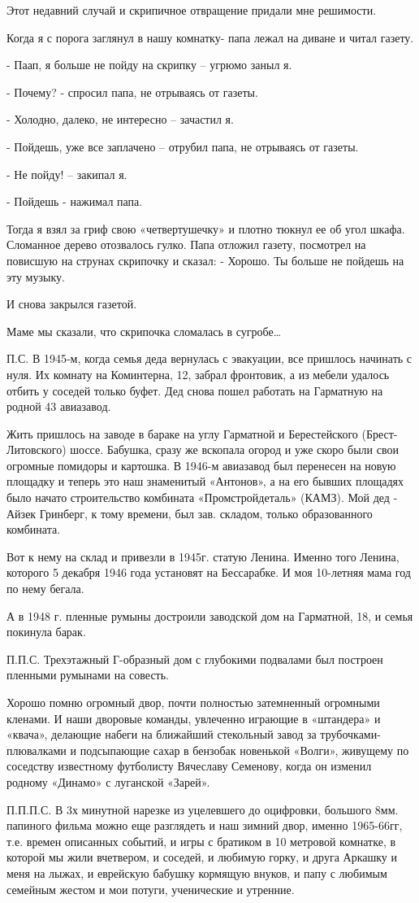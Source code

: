 Этот недавний случай и скрипичное отвращение придали мне решимости.

Когда я с порога заглянул в нашу комнатку- папа лежал на диване и читал газету.

- Паап, я больше не пойду на скрипку – угрюмо заныл я.

- Почему? - спросил папа, не отрываясь от газеты.

- Холодно, далеко, не интересно – зачастил я.

- Пойдешь, уже все заплачено – отрубил папа, не отрываясь от газеты.

- Не пойду! – закипал я.

- Пойдешь - нажимал папа.

Тогда я взял за гриф свою «четвертушечку» и плотно тюкнул ее об угол шкафа.
Сломанное дерево отозвалось гулко. Папа отложил газету, посмотрел на повисшую
на струнах скрипочку и сказал: - Хорошо. Ты больше не пойдешь на эту музыку. 

И снова закрылся газетой. 

Маме мы сказали, что скрипочка сломалась в сугробе…

П.С.  В 1945-м, когда семья деда вернулась с эвакуации, все пришлось начинать с
нуля. Их комнату на Коминтерна, 12, забрал фронтовик, а из мебели удалось
отбить у соседей только буфет. Дед снова пошел работать на Гарматную на родной
43 авиазавод.  

Жить пришлось на заводе в бараке на углу Гарматной и Берестейского
(Брест-Литовского) шоссе. Бабушка, сразу же вскопала огород и уже скоро были
свои огромные помидоры и картошка. В 1946-м авиазавод был перенесен на новую
площадку и теперь это наш знаменитый «Антонов», а на его бывших площадях было
начато строительство комбината «Промстройдеталь» (КАМЗ). Мой дед - Айзек
Гринберг, к тому времени, был зав. складом, только образованного комбината.

Вот к нему на склад и привезли в 1945г. статую Ленина. Именно того Ленина,
которого 5 декабря 1946 года   установят на Бессарабке. И моя 10-летняя мама
год по нему бегала. 

А в 1948 г. пленные румыны достроили заводской дом на Гарматной, 18, и семья
покинула барак. 

П.П.С. Трехэтажный Г-образный дом с глубокими подвалами был построен пленными
румынами на совесть. 

Хорошо помню огромный двор, почти полностью затемненный огромными кленами. И
наши дворовые команды, увлеченно играющие в «штандера» и «квача», делающие
набеги на ближайший стекольный завод за трубочками-плювалками и  подсыпающие
сахар в бензобак новенькой «Волги», живущему по соседству известному футболисту
Вячеславу Семенову, когда он изменил родному «Динамо» с луганской «Зарей».

П.П.П.С. В 3х минутной нарезке из уцелевшего до оцифровки, большого 8мм.
папиного фильма можно еще  разглядеть и наш зимний двор, именно 1965-66гг, т.е.
времен описанных событий, и игры с братиком в 10 метровой комнатке, в которой
мы жили вчетвером, и соседей, и любимую горку, и друга Аркашку и меня на лыжах,
и еврейскую бабушку кормящую внуков, и папу с  любимым семейным жестом и мои
потуги,  ученические и утренние.
